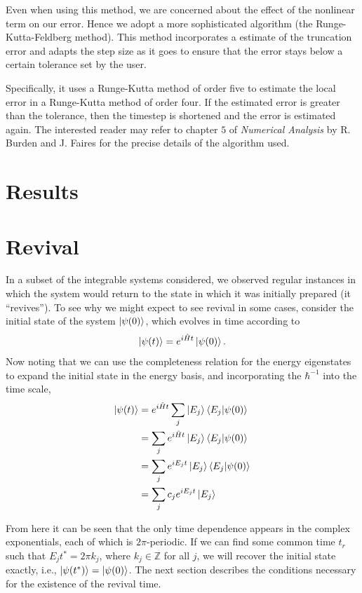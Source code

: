 \documentclass[a4paper, 10pt]{article}
\theoremstyle{plain}
\begin{document}
Even when using this method, we are concerned about the effect of the nonlinear 
term on our error. Hence we adopt a more sophisticated algorithm 
(the Runge-Kutta-Feldberg method). This method incorporates a estimate of the
truncation error and adapts the step size as it goes to ensure that the error
stays below a certain tolerance set by the user. 

Specifically, it uses a Runge-Kutta method of order five to estimate the 
local error in a Runge-Kutta method of order four. If the estimated error
is greater than the tolerance, then the timestep is shortened and the error is 
estimated again. The interested reader may refer to chapter $5$ of 
\emph{Numerical Analysis} by R. Burden and J. Faires \cite{Burden2005} for the 
precise details of the algorithm used.



\section{Results}

\section{Revival \label{revival}}

In a subset of the integrable systems considered, we observed regular instances
in which the system would return to the state in which it was initially
prepared (it ``revives''). To see why we might expect to see revival in
some cases, consider the initial state of the system $\ket{\psi(0)}$, which
evolves in time according to
\begin{equation}
 \ket{\psi(t)}=e^{i\hat{H}t}\ket{\psi(0)}.
\end{equation}
Now noting that we can use the completeness relation for the energy eigenstates
to expand the initial state in the energy basis, and incorporating the
$\hbar^{-1}$ into the time scale,
\begin{align}
\label{time_evolution}
 \ket{\psi(t)} &= e^{i\hat{H}t}\sum_j\ket{E_j}\braket{E_j|\psi(0)}  \nonumber \\
               &= \sum_je^{i\hat{H}t}\ket{E_j}\braket{E_j|\psi(0)}  \nonumber \\
               &= \sum_je^{iE_{j}t}\ket{E_j}\braket{E_j|\psi(0)}    \nonumber \\
               &= \sum_j c_{j}e^{iE_{j}t}\ket{E_j}
\end{align}

From here it can be seen that the only time dependence appears in the complex
exponentials, each of which is $2\pi$-periodic. If we can find some common
time $t_r$ such that $E_{j} t^*=2 \pi k_{j}$, where $k_{j} \in \mathbb{Z} $
for all $j$, we will recover the initial state exactly, i.e.,
$\ket{\psi(t^*)}=\ket{\psi(0)}$. The next section describes the conditions
necessary for the existence of the revival time.\\
\end{document}
